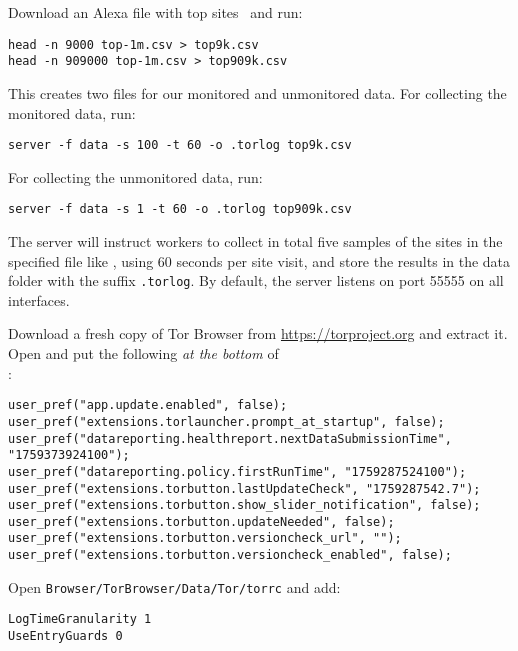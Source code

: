 \documentclass{article}
\begin{document}
Download an Alexa file with top sites~\cite{alexatop1k} and run:

\begin{lstlisting}
head -n 9000 top-1m.csv > top9k.csv
head -n 909000 top-1m.csv > top909k.csv
\end{lstlisting}

This creates two files for our monitored and unmonitored data.  For collecting
the monitored data, run:

\begin{lstlisting}
server -f data -s 100 -t 60 -o .torlog top9k.csv
\end{lstlisting}

For collecting the unmonitored data, run:

\begin{lstlisting}
server -f data -s 1 -t 60 -o .torlog top909k.csv
\end{lstlisting}

The server will instruct workers to collect in total
five samples of the sites in the specified file like ,
using 60 seconds per site visit,
and store the results in the data folder with the suffix \texttt{.torlog}.
By default, the server listens on port 55555 on all interfaces.

Download a fresh copy of Tor Browser from \url{https://torproject.org} and
extract it.  Open
 and put the
following \emph{at the bottom} of\\ :

\begin{lstlisting}
user_pref("app.update.enabled", false);
user_pref("extensions.torlauncher.prompt_at_startup", false);
user_pref("datareporting.healthreport.nextDataSubmissionTime", "1759373924100");
user_pref("datareporting.policy.firstRunTime", "1759287524100");
user_pref("extensions.torbutton.lastUpdateCheck", "1759287542.7");
user_pref("extensions.torbutton.show_slider_notification", false);
user_pref("extensions.torbutton.updateNeeded", false);
user_pref("extensions.torbutton.versioncheck_url", "");
user_pref("extensions.torbutton.versioncheck_enabled", false);
\end{lstlisting}

Open {\tt Browser/TorBrowser/Data/Tor/torrc} and add:

\begin{lstlisting}
LogTimeGranularity 1
UseEntryGuards 0
\end{lstlisting}
\end{document}
